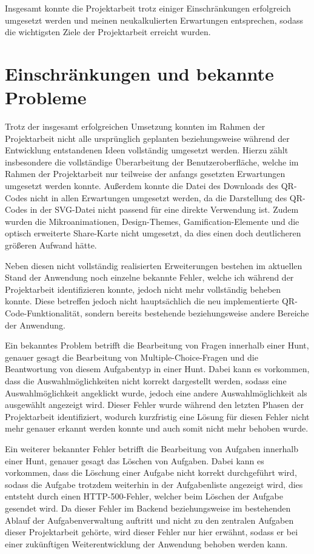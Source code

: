 ﻿\documentclass[oneside]{ausarbeitung}
\begin{document}
Insgesamt konnte die Projektarbeit trotz einiger Einschränkungen erfolgreich umgesetzt werden und meinen neukalkulierten Erwartungen entsprechen,
sodass die wichtigsten Ziele der Projektarbeit erreicht wurden.


\section{Einschränkungen und bekannte Probleme}
\label{sec:einschraenkungen-probleme}

Trotz der insgesamt erfolgreichen Umsetzung konnten im Rahmen der Projektarbeit nicht alle ursprünglich geplanten beziehungsweise während der Entwicklung
entstandenen Ideen vollständig umgesetzt werden. Hierzu zählt insbesondere die vollständige Überarbeitung der Benutzeroberfläche, welche im Rahmen der
Projektarbeit nur teilweise der anfangs gesetzten Erwartungen umgesetzt werden konnte. Außerdem konnte die Datei des Downloads des QR-Codes nicht
in allen Erwartungen umgesetzt werden, da die Darstellung des QR-Codes in der SVG-Datei nicht passend für eine direkte Verwendung ist. Zudem wurden 
die Mikroanimationen, Design-Themes, Gamification-Elemente und die optisch erweiterte Share-Karte nicht umgesetzt, da dies einen doch deutlicheren
größeren Aufwand hätte.

Neben diesen nicht vollständig realisierten Erweiterungen bestehen im aktuellen Stand der Anwendung noch einzelne bekannte Fehler, welche ich 
während der Projektarbeit identifizieren konnte, jedoch nicht mehr vollständig beheben konnte. Diese betreffen jedoch nicht hauptsächlich die neu
implementierte QR-Code-Funktionalität, sondern bereits bestehende beziehungsweise andere Bereiche der Anwendung. 

Ein bekanntes Problem betrifft die Bearbeitung von Fragen innerhalb einer Hunt, genauer gesagt die Bearbeitung von Multiple-Choice-Fragen und 
die Beantwortung von diesem Aufgabentyp in einer Hunt. Dabei kann es vorkommen, dass die Auswahlmöglichkeiten nicht korrekt dargestellt werden,
sodass eine Auswahlmöglichkeit angeklickt wurde, jedoch eine andere Auswahlmöglichkeit als ausgewählt angezeigt wird. Dieser Fehler wurde während den 
letzten Phasen der Projektarbeit identifiziert, wodurch kurzfristig eine Lösung für diesen Fehler nicht mehr genauer erkannt werden konnte und auch
somit nicht mehr behoben wurde.

Ein weiterer bekannter Fehler betrifft die Bearbeitung von Aufgaben innerhalb einer Hunt, genauer gesagt das Löschen von Aufgaben. Dabei kann es
vorkommen, dass die Löschung einer Aufgabe nicht korrekt durchgeführt wird, sodass die Aufgabe trotzdem weiterhin in der Aufgabenliste angezeigt wird, dies
entsteht durch einen HTTP-500-Fehler, welcher beim Löschen der Aufgabe gesendet wird. Da dieser Fehler im Backend beziehungsweise im bestehenden 
Ablauf der Aufgabenverwaltung auftritt und nicht zu den zentralen Aufgaben dieser Projektarbeit gehörte, wird dieser Fehler nur hier erwähnt, sodass
er bei einer zukünftigen Weiterentwicklung der Anwendung behoben werden kann.
\end{document}
